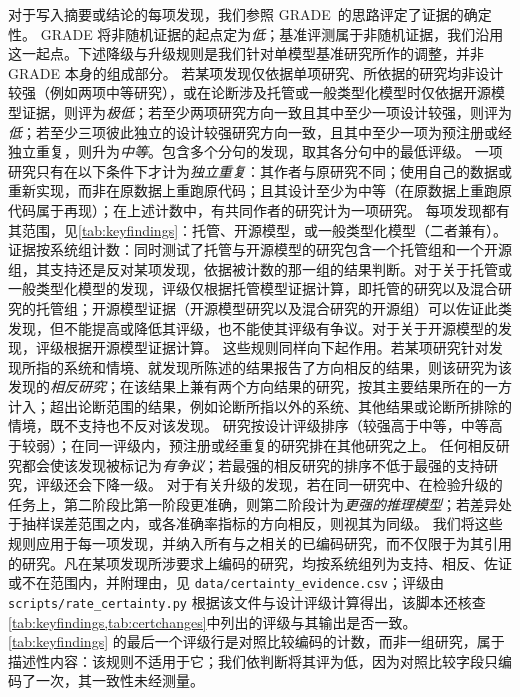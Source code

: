 对于写入摘要或结论的每项发现，我们参照 GRADE~\cite{guyatt2008grade}的思路评定了证据的确定性。
GRADE 将非随机证据的起点定为\emph{低}；基准评测属于非随机证据，我们沿用这一起点。下述降级与升级规则是我们针对单模型基准研究所作的调整，并非 GRADE 本身的组成部分。
若某项发现仅依据单项研究、所依据的研究均非设计较强（例如两项中等研究），或在论断涉及托管\jev{}或一般类型化模型时仅依据开源模型证据，则评为\emph{极低}；若至少两项研究方向一致且其中至少一项设计较强，则评为\emph{低}；若至少三项彼此独立的设计较强研究方向一致，且其中至少一项为预注册或经独立重复，则升为\emph{中等}。包含多个分句的发现，取其各分句中的最低评级。
一项研究只有在以下条件下才计为\emph{独立重复}：其作者与原研究不同；使用自己的数据或重新实现，而非在原数据上重跑原代码；且其设计至少为中等（在原数据上重跑原代码属于再现）；在上述计数中，有共同作者的研究计为一项研究。
每项发现都有其范围，见\cref{tab:keyfindings}：托管\jev{}、开源模型，或一般类型化模型（二者兼有）。证据按系统组计数：同时测试了托管\jev{}与开源模型的研究包含一个托管组和一个开源组，其支持还是反对某项发现，依据被计数的那一组的结果判断。对于关于托管\jev{}或一般类型化模型的发现，评级仅根据托管模型证据计算，即托管\jev{}的研究以及混合研究的托管组；开源模型证据（开源模型研究以及混合研究的开源组）可以佐证此类发现，但不能提高或降低其评级，也不能使其评级有争议。对于关于开源模型的发现，评级根据开源模型证据计算。
这些规则同样向下起作用。若某项研究针对发现所指的系统和情境、就发现所陈述的结果报告了方向相反的结果，则该研究为该发现的\emph{相反研究}；在该结果上兼有两个方向结果的研究，按其主要结果所在的一方计入；超出论断范围的结果，例如论断所指以外的系统、其他结果或论断所排除的情境，既不支持也不反对该发现。
研究按设计评级排序（较强高于中等，中等高于较弱）；在同一评级内，预注册或经重复的研究排在其他研究之上。
任何相反研究都会使该发现被标记为\emph{有争议}；若最强的相反研究的排序不低于最强的支持研究，评级还会下降一级。
对于有关升级的发现，若在同一研究中、在检验升级的任务上，第二阶段比第一阶段更准确，则第二阶段计为\emph{更强的推理模型}；若差异处于抽样误差范围之内，或各准确率指标的方向相反，则视其为同级。
我们将这些规则应用于每一项发现，并纳入所有与之相关的已编码研究，而不仅限于为其引用的研究。凡在某项发现所涉要求上编码的研究，均按系统组列为支持、相反、佐证或不在范围内，并附理由，见 \nolinkurl{data/certainty_evidence.csv}；评级由 \nolinkurl{scripts/rate_certainty.py} 根据该文件与设计评级计算得出，该脚本还核查\cref{tab:keyfindings,tab:certchanges}中列出的评级与其输出是否一致。
\cref{tab:keyfindings} 的最后一个评级行是对照比较编码的计数，而非一组研究，属于描述性内容：该规则不适用于它；我们依判断将其评为低，因为对照比较字段只编码了一次，其一致性未经测量。

